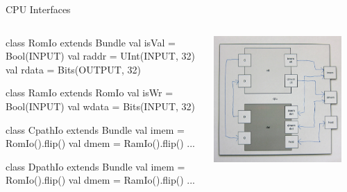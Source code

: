 \documentclass[xcolor=pdflatex,dvipsnames,table]{beamer}
\begin{document}
\begin{frame}[fragile]{CPU Interfaces}
\begin{columns}

\begin{scala}
class RomIo extends Bundle {
  val isVal = Bool(INPUT)
  val raddr = UInt(INPUT, 32)
  val rdata = Bits(OUTPUT, 32) 
}

class RamIo extends RomIo {
  val isWr  = Bool(INPUT)
  val wdata = Bits(INPUT, 32) 
}

class CpathIo extends Bundle {
  val imem = RomIo().flip()
  val dmem = RamIo().flip()
  ... }

class DpathIo extends Bundle {
  val imem = RomIo().flip()
  val dmem = RamIo().flip()
  ... }
\end{scala}


\begin{center}
\includegraphics[width=0.9\textwidth]{../tutorial/figs/cpu.png} 
\end{center}

\end{columns}
\end{frame}
\end{document}
